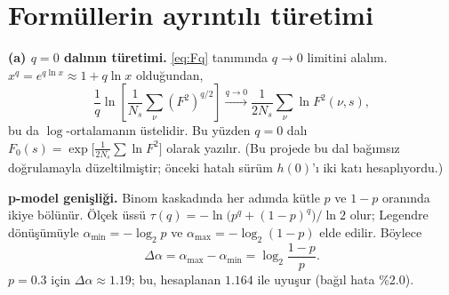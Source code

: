 \documentclass[11pt,a4paper]{article}
\newcommand{\Dal}{\Delta\alpha}
\begin{document}
\appendix
\section{Formüllerin ayrıntılı türetimi}
\label{app:formul}

\textbf{(a) $q=0$ dalının türetimi.} \eqref{eq:Fq} tanımında $q\to 0$
limitini alalım. $x^{q} = e^{q\ln x} \approx 1 + q\ln x$ olduğundan,
\begin{equation}
  \frac{1}{q}\ln\!\left[\frac{1}{N_s}\sum_\nu (F^2)^{q/2}\right]
  \xrightarrow{q\to 0} \frac{1}{2N_s}\sum_\nu \ln F^2(\nu,s),
\end{equation}
bu da $\log$-ortalamanın üstelidir. Bu yüzden $q=0$ dalı
$F_0(s)=\exp\!\bigl[\tfrac{1}{2N_s}\sum \ln F^2\bigr]$ olarak yazılır.
(Bu projede bu dal bağımsız doğrulamayla düzeltilmiştir; önceki hatalı sürüm
$h(0)$'ı iki katı hesaplıyordu.)

\vspace{0.5em}
\textbf{p-model genişliği.} Binom kaskadında her adımda kütle $p$ ve $1-p$
oranında ikiye bölünür. Ölçek üssü
$\tau(q) = -\ln\!\bigl(p^q + (1-p)^q\bigr)/\ln 2$ olur; Legendre dönüşümüyle
$\alpha_{\min} = -\log_2 p$ ve $\alpha_{\max} = -\log_2(1-p)$ elde edilir.
Böylece
\begin{equation}
  \Dal = \alpha_{\max} - \alpha_{\min} = \log_2\frac{1-p}{p}.
\end{equation}
$p=0.3$ için $\Dal \approx 1.19$; bu, hesaplanan $1.164$ ile uyuşur
(bağıl hata \%2.0).
\end{document}
